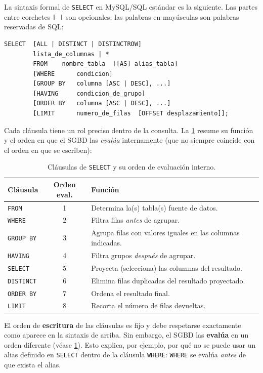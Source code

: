 \documentclass[12pt, a4paper]{article}
\begin{document}
	La sintaxis formal de \texttt{SELECT} en MySQL/SQL estándar es la
	siguiente.
	Las partes entre corchetes \texttt{[ ]} son opcionales; las palabras
	en mayúsculas son palabras reservadas de SQL:
	
	\begin{lstlisting}[caption={Sintaxis completa de SELECT.}]
		SELECT  [ALL | DISTINCT | DISTINCTROW]
		lista_de_columnas | *
		FROM    nombre_tabla  [[AS] alias_tabla]
		[WHERE      condicion]
		[GROUP BY   columna [ASC | DESC], ...]
		[HAVING     condicion_de_grupo]
		[ORDER BY   columna [ASC | DESC], ...]
		[LIMIT      numero_de_filas  [OFFSET desplazamiento]];
	\end{lstlisting}
	
	Cada cláusula tiene un rol preciso dentro de la consulta.
	La \cref{tab:clausulas-select} resume su función y el orden en que
	el SGBD las \textit{evalúa} internamente (que no siempre coincide
	con el orden en que se escriben):
	
	\begin{table}[H]
		\centering
		\small
		\renewcommand{\arraystretch}{1.4}
		\begin{tabularx}{\linewidth}{@{} l c X @{}}
			\toprule
			\textbf{Cláusula} & \textbf{Orden eval.} & \textbf{Función} \\
			\midrule
			\texttt{FROM}     & 1 & Determina la(s) tabla(s) fuente de datos. \\
			\texttt{WHERE}    & 2 & Filtra filas \textit{antes} de agrupar. \\
			\texttt{GROUP BY} & 3 & Agrupa filas con valores iguales en las columnas indicadas. \\
			\texttt{HAVING}   & 4 & Filtra grupos \textit{después} de agrupar. \\
			\texttt{SELECT}   & 5 & Proyecta (selecciona) las columnas del resultado. \\
			\texttt{DISTINCT} & 6 & Elimina filas duplicadas del resultado proyectado. \\
			\texttt{ORDER BY} & 7 & Ordena el resultado final. \\
			\texttt{LIMIT}    & 8 & Recorta el número de filas devueltas. \\
			\bottomrule
		\end{tabularx}
		\caption{Cláusulas de \texttt{SELECT} y su orden de evaluación interno.}
		\label{tab:clausulas-select}
	\end{table}
	
	\begin{nota}
		El orden de \textbf{escritura} de las cláusulas es fijo y debe
		respetarse exactamente como aparece en la sintaxis de arriba.
		Sin embargo, el SGBD las \textbf{evalúa} en un orden diferente
		(véase \cref{tab:clausulas-select}).
		Esto explica, por ejemplo, por qué no se puede usar un alias
		definido en \texttt{SELECT} dentro de la cláusula \texttt{WHERE}:
		\texttt{WHERE} se evalúa \textit{antes} de que exista el alias.
	\end{nota}
	
\end{document}

